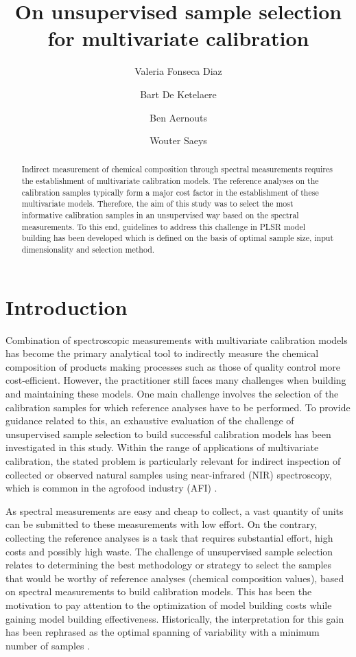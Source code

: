 \documentclass[journal=ancham,manuscript=article]{achemso}
\author{Valeria Fonseca Diaz}
\author{Bart De Ketelaere}
\author{Ben Aernouts}
\author{Wouter Saeys}
\affiliation[KU Leuven]
{KU Leuven, Kasteelpark
Arenberg 30, Leuven, Belgium}
\title[An \textsf{achemso} demo]
  {On unsupervised sample selection for multivariate calibration}
\begin{document}
\begin{abstract}
Indirect measurement of chemical composition through spectral measurements requires the establishment of multivariate calibration models. The reference analyses on the calibration samples typically form a major cost factor in the establishment of these multivariate models. Therefore, the aim of this study was to select the most informative calibration samples in an unsupervised way based on the spectral measurements. To this end, guidelines to address this challenge in PLSR model building has been developed which is defined on the basis of optimal sample size, input dimensionality and selection method. 

\end{abstract}%


\section{Introduction}\label{introduction}

Combination of spectroscopic measurements with multivariate calibration models has become the primary analytical tool to indirectly measure the chemical composition of products making processes such as those of quality control more cost-efficient. However, the practitioner still faces many challenges when building and maintaining these models. One main challenge involves the selection of the calibration samples for which reference analyses have to be performed. To provide guidance related to this, an exhaustive evaluation of the challenge of unsupervised sample selection to build successful calibration models has been investigated in this study. Within the range of applications of multivariate calibration, the stated problem is particularly relevant for indirect inspection of collected or observed natural samples using near-infrared (NIR) spectroscopy, which is common in the agrofood industry (AFI) \cite{Au2020,Diaz-Olivares2020, Saeys2005, Bobelyn2010}.  

As spectral measurements are easy and cheap to collect, a vast quantity of units can be submitted to these measurements with low effort. On the contrary, collecting the reference analyses is a task that requires substantial effort, high costs and possibly high waste. The challenge of unsupervised sample selection relates to determining the best methodology or strategy to select the samples that would be worthy of reference analyses (chemical composition values), based on spectral measurements to build calibration models.
This has been the motivation to pay attention to the optimization of model building costs while gaining model building effectiveness. Historically, the interpretation for this gain has been rephrased as the optimal spanning of variability with a minimum number of samples \cite{Naes1990, Saeys2019,Kennard1969}.
\end{document}

